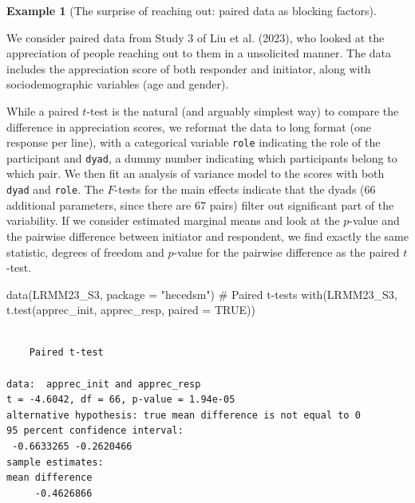 \documentclass[
  11pt,
  letterpaper,
]{scrbook}
\newenvironment{Shaded}{\begin{snugshade}}{\end{snugshade}}
\newcommand{\AttributeTok}[1]{\textcolor[rgb]{0.40,0.45,0.13}{#1}}
\newcommand{\CommentTok}[1]{\textcolor[rgb]{0.37,0.37,0.37}{#1}}
\newcommand{\ConstantTok}[1]{\textcolor[rgb]{0.56,0.35,0.01}{#1}}
\newcommand{\FunctionTok}[1]{\textcolor[rgb]{0.28,0.35,0.67}{#1}}
\newcommand{\NormalTok}[1]{\textcolor[rgb]{0.00,0.23,0.31}{#1}}
\newcommand{\StringTok}[1]{\textcolor[rgb]{0.13,0.47,0.30}{#1}}
\theoremstyle{definition}
\newtheorem{example}{Example}[chapter]
\theoremstyle{remark}
\begin{document}
\begin{example}[The surprise of reaching out: paired data as blocking
factors]\protect\hypertarget{exm-reachingout}{}\label{exm-reachingout}

We consider paired data from Study 3 of Liu et al. (2023), who looked at
the appreciation of people reaching out to them in a unsolicited manner.
The data includes the appreciation score of both responder and
initiator, along with sociodemographic variables (age and gender).

While a paired \(t\)-test is the natural (and arguably simplest way) to
compare the difference in appreciation scores, we reformat the data to
long format (one response per line), with a categorical variable
\texttt{role} indicating the role of the participant and \texttt{dyad},
a dummy number indicating which participants belong to which pair. We
then fit an analysis of variance model to the scores with both
\texttt{dyad} and \texttt{role}. The \(F\)-tests for the main effects
indicate that the dyads (66 additional parameters, since there are 67
pairs) filter out significant part of the variability. If we consider
estimated marginal means and look at the \(p\)-value and the pairwise
difference between initiator and respondent, we find exactly the same
statistic, degrees of freedom and \(p\)-value for the pairwise
difference as the paired \(t\)-test.

\begin{Shaded}
\begin{Highlighting}[]
\FunctionTok{data}\NormalTok{(LRMM23\_S3, }\AttributeTok{package =} \StringTok{"hecedsm"}\NormalTok{)}
\CommentTok{\# Paired t{-}tests}
\FunctionTok{with}\NormalTok{(LRMM23\_S3, }\FunctionTok{t.test}\NormalTok{(apprec\_init, apprec\_resp, }\AttributeTok{paired =} \ConstantTok{TRUE}\NormalTok{))}
\end{Highlighting}
\end{Shaded}

\begin{verbatim}

    Paired t-test

data:  apprec_init and apprec_resp
t = -4.6042, df = 66, p-value = 1.94e-05
alternative hypothesis: true mean difference is not equal to 0
95 percent confidence interval:
 -0.6633265 -0.2620466
sample estimates:
mean difference 
     -0.4626866 
\end{verbatim}


\end{example}
\end{document}
